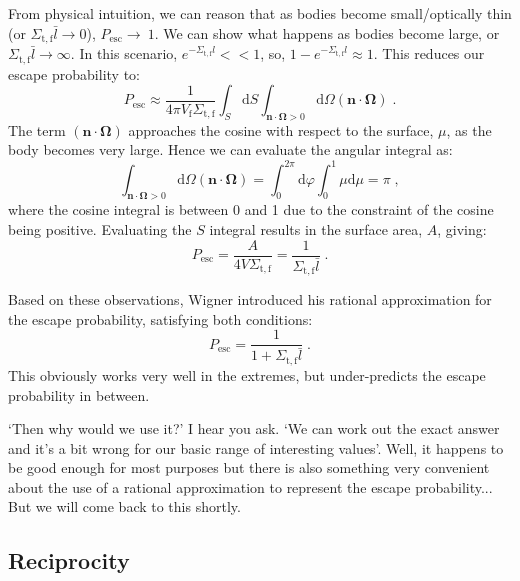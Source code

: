 From physical intuition, we can reason that as bodies become small/optically thin (or $\Sigma_\mathrm{t,f}\bar{l}\rightarrow 0$), $P_\mathrm{esc}\rightarrow~1$. We can show what happens as bodies become large, or $\Sigma_\mathrm{t,f}\bar{l}\rightarrow \infty$. In this scenario, $e^{-\Sigma_\mathrm{t,f}l}<< 1$, so, $1-e^{-\Sigma_\mathrm{t,f}l}\approx 1$. This reduces our escape probability to:
\begin{equation*}
    P_\mathrm{esc}\approx \frac{1}{4\pi V_\mathrm{f}\Sigma_\mathrm{t,f}}\int_S\mathrm{d}S\int_{\mathbf{n}\cdot\mathbf{\Omega}>0}\mathrm{d}\Omega (\mathbf{n}\cdot\mathbf{\Omega})\;\mathrm{.}
\end{equation*}
The term $(\mathbf{n}\cdot\mathbf{\Omega})$ approaches the cosine with respect to the surface, $\mu$, as the body becomes very large. Hence we can evaluate the angular integral as:
\begin{equation*}
    \int_{\mathbf{n}\cdot\mathbf{\Omega}>0}\mathrm{d}\Omega (\mathbf{n}\cdot\mathbf{\Omega}) = \int^{2\pi}_0\mathrm{d}\varphi \int^1_0\mu\mathrm{d}\mu = \pi\;\mathrm{,}
\end{equation*}
where the cosine integral is between 0 and 1 due to the constraint of the cosine being positive. Evaluating the $S$ integral results in the surface area, $A$, giving:
\begin{equation*}
    P_\mathrm{esc} = \frac{A}{4V\Sigma_\mathrm{t,f}} = \frac{1}{\Sigma_{\mathrm{t,f}}\bar{l}}\;\mathrm{.}
\end{equation*}

Based on these observations, Wigner introduced his rational approximation for the escape probability, satisfying both conditions:
\begin{equation*}
    P_\mathrm{esc} = \frac{1}{1+\Sigma_\mathrm{t,f}\bar{l}}\;\mathrm{.}
\end{equation*}
This obviously works very well in the extremes, but under-predicts the escape probability in between.

`Then why would we use it?' I hear you ask. `We can work out the exact answer and it's a bit wrong for our basic range of interesting values'. Well, it happens to be good enough for most purposes but there is also something very convenient about the use of a rational approximation to represent the escape probability... But we will come back to this shortly.

\subsection{Reciprocity}

